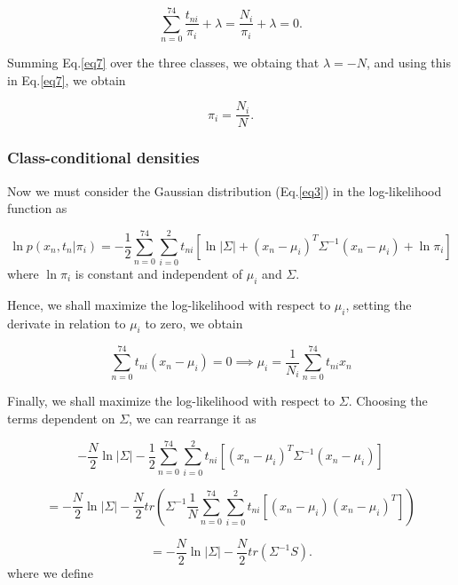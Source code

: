 \documentclass{article}
\begin{document}
\begin{equation}
  \label{eq7}
  \sum_{n=0}^{74} \dfrac{t_{ni}}{\pi_i} + \lambda = \dfrac{N_i}{\pi_i} + \lambda = 0.
\end{equation}

Summing Eq.\eqref{eq7} over the three classes, we obtaing that $\lambda=-N$, and using this in Eq.\eqref{eq7}, we obtain

\begin{equation}
  \label{eq8}
  \pi_i = \dfrac{N_i}{N}.
\end{equation}

\subsubsection{Class-conditional densities}
Now we must consider the Gaussian distribution (Eq.\eqref{eq3}) in the log-likelihood function as

\begin{equation}
\label{eq9}
\ln{p({x_n, t_n}| {\pi_i})} = -\dfrac{1}{2} \sum_{n=0}^{74} \sum_{i=0}^{2} t_{ni} \left[ \ln{|\Sigma|} + (x_n - \mu_i)^T\Sigma^{-1}(x_n - \mu_i) + \ln{\pi_i} \right]
\end{equation}
where $\ln{\pi_i}$ is constant and independent of $\mu_i$ and $\Sigma$.

Hence, we shall maximize the log-likelihood with respect to $\mu_i$, setting the derivate in relation to $\mu_i$ to zero, we obtain

\begin{equation}
\label{eq10}
\sum_{n=0}^{74} t_{ni} (x_n - \mu_i) = 0 \implies \mu_i = \dfrac{1}{N_i} \sum_{n=0}^{74} t_{ni} x_n
\end{equation}

Finally, we shall maximize the log-likelihood with respect to $\Sigma$. Choosing the terms dependent on $\Sigma$, we can rearrange it as

\begin{equation*}
-\dfrac{N}{2}\ln{|\Sigma|} - \dfrac{1}{2} \sum_{n=0}^{74} \sum_{i=0}^{2} t_{ni}  \left[(x_n - \mu_i)^T\Sigma^{-1}(x_n - \mu_i)\right]
\end{equation*}

\begin{equation*}
= -\dfrac{N}{2}\ln{|\Sigma|} - \dfrac{N}{2} tr\left( \Sigma^{-1} \dfrac{1}{N} \sum_{n=0}^{74} \sum_{i=0}^{2} t_{ni}  \left[(x_n - \mu_i)(x_n - \mu_i)^T\right]\right)
\end{equation*}

\begin{equation}
\label{eq11}
= -\dfrac{N}{2}\ln{|\Sigma|} - \dfrac{N}{2} tr\left(\Sigma^{-1}S\right).
\end{equation}
where we define
\end{document}

